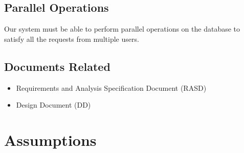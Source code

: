 \documentclass{report}
\begin{document}
		\subsection{Parallel Operations}
		Our system must be able to perform parallel operations on the database to satisfy all the requests from multiple users.

		\subsection{Documents Related}

			\begin{itemize}
				\item Requirements and Analysis Specification Document (RASD)

				\item Design Document (DD)
			\end{itemize}

	\section{Assumptions}
\end{document}
